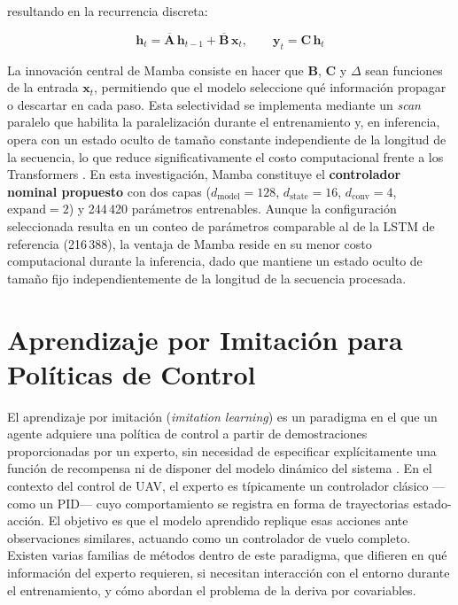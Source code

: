 \noindent resultando en la recurrencia discreta:

\begin{equation}
\mathbf{h}_t = \overline{\mathbf{A}}\,\mathbf{h}_{t-1} + \overline{\mathbf{B}}\,\mathbf{x}_t, \qquad \mathbf{y}_t = \mathbf{C}\,\mathbf{h}_t
\end{equation}

La innovación central de Mamba consiste en hacer que $\mathbf{B}$, $\mathbf{C}$ y $\Delta$ sean funciones de la entrada $\mathbf{x}_t$, permitiendo que el modelo seleccione qué información propagar o descartar en cada paso. Esta selectividad se implementa mediante un \textit{scan} paralelo que habilita la paralelización durante el entrenamiento y, en inferencia, opera con un estado oculto de tamaño constante independiente de la longitud de la secuencia, lo que reduce significativamente el costo computacional frente a los Transformers \cite{gu2023mamba}. En esta investigación, Mamba constituye el \textbf{controlador nominal propuesto} con dos capas ($d_{\text{model}}=128$, $d_{\text{state}}=16$, $d_{\text{conv}}=4$, $\text{expand}=2$) y 244\,420 parámetros entrenables. Aunque la configuración seleccionada resulta en un conteo de parámetros comparable al de la LSTM de referencia (216\,388), la ventaja de Mamba reside en su menor costo computacional durante la inferencia, dado que mantiene un estado oculto de tamaño fijo independientemente de la longitud de la secuencia procesada.


\section{Aprendizaje por Imitación para Políticas de Control}

El aprendizaje por imitación (\textit{imitation learning}) es un paradigma en el que un agente adquiere una política de control a partir de demostraciones proporcionadas por un experto, sin necesidad de especificar explícitamente una función de recompensa ni de disponer del modelo dinámico del sistema \cite{zhang2023, kumar2021}. En el contexto del control de UAV, el experto es típicamente un controlador clásico —como un PID— cuyo comportamiento se registra en forma de trayectorias estado-acción. El objetivo es que el modelo aprendido replique esas acciones ante observaciones similares, actuando como un controlador de vuelo completo. Existen varias familias de métodos dentro de este paradigma, que difieren en qué información del experto requieren, si necesitan interacción con el entorno durante el entrenamiento, y cómo abordan el problema de la deriva por covariables.

